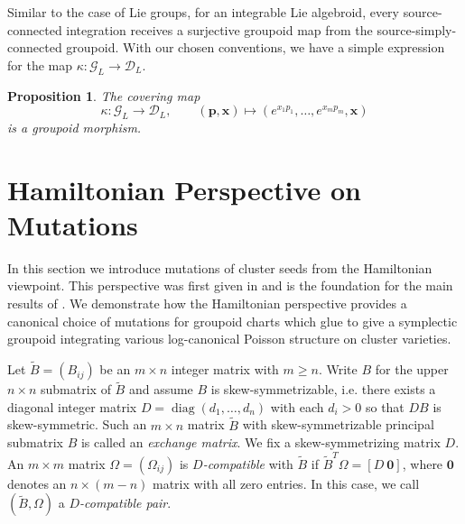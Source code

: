 \documentclass{amsart}
\newtheorem{proposition}[theorem]{Proposition}
\numberwithin{equation}{section}
\newcommand{\bfp}{\mathbf{p}}
\newcommand{\bfx}{\mathbf{x}}
\newcommand{\cG}{\mathcal{G}}
\newcommand{\cD}{\mathcal{D}}
\newcommand{\diag}{\operatorname{diag}}
\begin{document}
Similar to the case of Lie groups, for an integrable Lie algebroid, every source-connected integration receives a surjective groupoid map from the source-simply-connected groupoid.
With our chosen conventions, we have a simple expression for the map $\kappa: \cG_L \to \cD_L$.
\begin{proposition}
  The covering map
  $$\kappa: \cG_L \to \cD_L, \qquad (\bfp, \bfx) \mapsto (e^{x_1p_1}, \ldots, e^{x_mp_m}, \bfx)$$
  is a groupoid morphism.
\end{proposition}


\section{Hamiltonian Perspective on Mutations}
\label{sec:cluster}

In this section we introduce mutations of cluster seeds from the Hamiltonian viewpoint.
This perspective was first given in \cite{MR2470108} and is the foundation for the main results of \cite{MR3691969}.
We demonstrate how the Hamiltonian perspective provides a canonical choice of mutations for groupoid charts which glue to give a symplectic groupoid integrating various log-canonical Poisson structure on cluster varieties.

Let $\tilde B=(B_{ij})$ be an $m\times n$ integer matrix with $m\ge n$.  
Write $B$ for the upper $n\times n$ submatrix of $\tilde B$ and assume $B$ is skew-symmetrizable, i.e. there exists a diagonal integer matrix $D=\diag(d_1,\ldots,d_n)$ with each $d_i>0$ so that $DB$ is skew-symmetric. 
Such an $m\times n$ matrix $\tilde B$ with skew-symmetrizable principal submatrix $B$ is called an \emph{exchange matrix}.
We fix a skew-symmetrizing matrix $D$.
An $m\times m$ matrix $\Omega=(\Omega_{ij})$ is \emph{$D$-compatible} with $\tilde B$ if $\tilde B^T\Omega=[D\ \boldsymbol{0}]$, where $\boldsymbol{0}$ denotes an $n\times(m-n)$ matrix with all zero entries.
In this case, we call $(\tilde B,\Omega)$ a \emph{$D$-compatible pair}.
\end{document}
